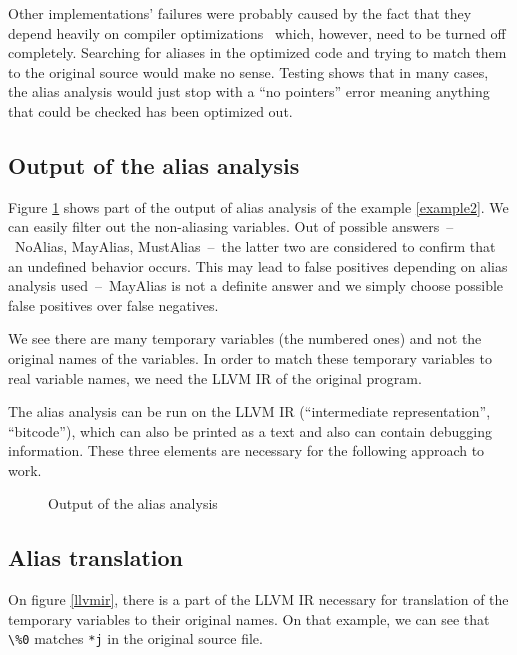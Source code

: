 Other implementations' failures were probably caused by the fact that they depend heavily on compiler optimizations~\cite{alias-analysis-optimizations} which, however, need to be turned off completely. Searching for aliases in the optimized code and trying to match them to the original source would make no sense. Testing shows that in many cases, the alias analysis would just stop with a ``no pointers'' error meaning anything that could be checked has been optimized out.

\subsection{Output of the alias analysis}
Figure \ref{alias-output} shows part of the output of alias analysis of the example \ref{example2}. We can easily filter out the non-aliasing variables. Out of possible answers~--~NoAlias, MayAlias, MustAlias~--~the latter two are considered to confirm that an undefined behavior occurs. This may lead to false positives depending on alias analysis used~--~MayAlias is not a definite answer and we simply choose possible false positives over false negatives.

We see there are many temporary variables (the numbered ones) and not the original names of the variables. In order to match these temporary variables to real variable names, we need the LLVM IR of the original program.

The alias analysis can be run on the LLVM IR (``intermediate representation'', ``bitcode''), which can also be printed as a text and also can contain debugging information. These three elements are necessary for the following approach to work.
\begin{figure}
\caption{Output of the alias analysis}
\label{alias-output}
\end{figure}

\subsection{Alias translation}
On figure \ref{llvmir}, there is a part of the LLVM IR necessary for translation of the temporary variables to their original names. On that example, we can see that \verb|\%0| matches \verb|*j| in the original source file.

